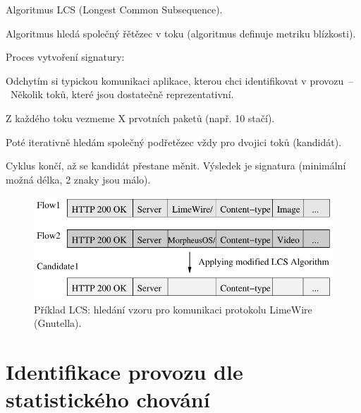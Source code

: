 \begin{compactitem}
    \item Algoritmus LCS (Longest Common Subsequence).
    \item Algoritmus hledá  společný řětězec v toku (algoritmus definuje metriku blízkosti).
    \item Proces vytvoření signatury: \begin{compactitem}
        \item Odchytím si typickou komunikaci aplikace, kterou chci identifikovat v provozu~--~Několik toků, které jsou dostatečně reprezentativní.
        \item Z každého toku vezmeme X prvotních paketů (např. 10 stačí).
        \item Poté iterativně hledám  společný podřetězec vždy pro dvojici toků (kandidát).
        \item Cyklus končí, až se kandidát přestane měnit. Výsledek je signatura (minimální možná délka, 2 znaky jsou málo).
    \end{compactitem}

    \begin{figure}[H]
        \centering
        \includegraphics[width=0.75\linewidth]{lcs_example.png}
        \caption{Příklad LCS: hledání vzoru pro komunikaci protokolu LimeWire (Gnutella).}
    \end{figure}
\end{compactitem}


\section{Identifikace provozu dle statistického chování}

